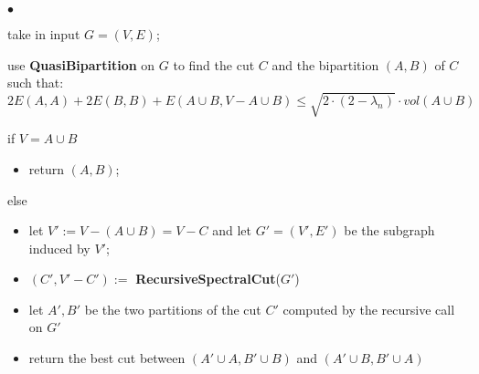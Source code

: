 \begin{list}{$\bullet$}{}
	\item take in input $ G = (V,E) $;
	\item use \textbf{QuasiBipartition} on $ G $ to find the cut $ C $ and the bipartition $ (A,B) $ of $ C $ such that:
	\[ 2E(A,A) + 2E(B,B) + E(A \cup B, V - A \cup B) \leq \sqrt{2 \cdot (2-\lambda_n)} \cdot vol(A \cup B)  \]
	\item if $ V = A \cup B $
	\begin{itemize}
		\item return $ (A,B) $;
	\end{itemize}
	\item else
	\begin{itemize}
		\item let $ V' := V - (A \cup B) = V - C $ and let $ G' =(V',E')$ be the subgraph induced by $V'$;
		\item $ (C', V'-C') := $ \textbf{RecursiveSpectralCut}($ G' $)
		\item let $ A', B' $ be the two partitions of the cut  $ C' $  computed by the recursive call on $ G' $
		\item return the best cut between 
		$ (A' \cup A, B' \cup B)$ and $ (A' \cup B, B' \cup A)$
\end{itemize}
\end{list}
\bigskip

